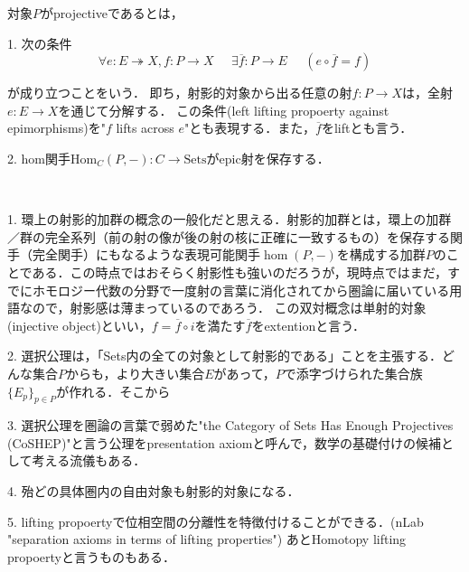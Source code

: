 \documentclass[uplatex, dvipdfmx]{jsarticle}
\begin{document}
\begin{definition*}[射影的対象の定義２種]\label{def-projective-object}対象$P$がprojectiveであるとは，

    1. 次の条件
    \[ \forall e:E\twoheadrightarrow X, f:P\to X \;\;\;\;\; \exists \overline{f}:P\to E\;\;\;\;\; (e\circ\overline{f}=f) \]
    \begin{center}
    \end{center}
    が成り立つことをいう．
    即ち，射影的対象から出る任意の射$f:P\to X$は，全射$e:E\to X$を通じて分解する．
    この条件(left lifting propoerty against epimorphisms)を"$f$ lifts across $e$"とも表現する．また，$\overline{f}$をliftとも言う．

    2. hom関手$\mathrm{Hom}_C(P,-):C\to\mathrm{Sets}$がepic射を保存する．
\end{definition*}
\begin{remark*}　
    
    1. 環上の射影的加群の概念の一般化だと思える．射影的加群とは，環上の加群／群の完全系列（前の射の像が後の射の核に正確に一致するもの）を保存する関手（完全関手）にもなるような表現可能関手$\hom(P,-)$を構成する加群$P$のことである．この時点ではおそらく射影性も強いのだろうが，現時点ではまだ，すでにホモロジー代数の分野で一度射の言葉に消化されてから圏論に届いている用語なので，射影感は薄まっているのであろう．
    この双対概念は単射的対象(injective object)といい，$f=\overline{f}\circ i$を満たす$\overline{f}$をextentionと言う．

    2. 選択公理は，「Sets内の全ての対象として射影的である」ことを主張する．どんな集合$P$からも，より大きい集合$E$があって，$P$で添字づけられた集合族$\{E_p\}_{p\in P}$が作れる．そこから

    3. 選択公理を圏論の言葉で弱めた"the Category of Sets Has Enough Projectives (CoSHEP)"と言う公理をpresentation axiomと呼んで，数学の基礎付けの候補として考える流儀もある．
    
    4. 殆どの具体圏内の自由対象も射影的対象になる．

    5. lifting propoertyで位相空間の分離性を特徴付けることができる．(nLab "separation axioms in terms of lifting properties")
    あとHomotopy lifting propoertyと言うものもある．
\end{remark*}
\end{document}
